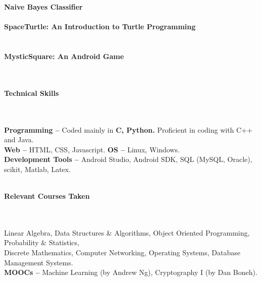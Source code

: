 \documentclass[a4paper,10pt]{article}
\newcommand{\lsep}{-0.5cm}
\newcommand{\resheading}[1]{{\large \colorbox{mygrey}{\begin{minipage}{0.99\textwidth}{\textbf{#1 \vphantom{p\^{E}}}}\end{minipage}}}}
\begin{document}
\indent\textbf{Naive Bayes Classifier }\\
\\

\indent\textbf{SpaceTurtle: An Introduction to  Turtle Programming}\\
 \\
\\

\indent\textbf{MysticSquare: An Android Game}\\
\\\\

\resheading{\textbf{Technical Skills} }\\\\[\lsep]

\indent\textbf{Programming -- }Coded mainly in \textbf{C, Python.} Proficient in coding with C++ and Java.\\
\indent\textbf{Web -- } HTML, CSS, Javascript. \indent\indent\textbf{OS -- } Linux, Windows.\\
\indent\textbf{Development Tools --} Android Studio, Android SDK, SQL (MySQL, Oracle), scikit, Matlab, Latex.\\\\


\resheading{\textbf{Relevant Courses Taken} }\\\\[\lsep]

\indent Linear Algebra, Data Structures \& Algorithms, Object Oriented Programming, Probability \& Statistics,\\
\indent Discrete Mathematics, Computer Networking, Operating Systems, Database Management Systems.\\
\indent\textbf{MOOCs -- }Machine Learning (by Andrew Ng), Cryptography I (by Dan Boneh).\\
\\
\end{document}
